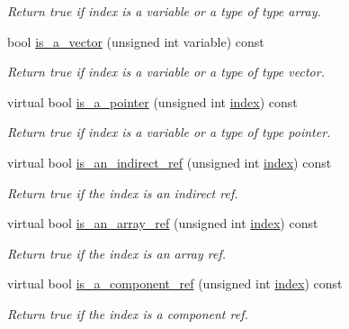 \begin{DoxyCompactItemize}
\begin{DoxyCompactList}\small\item\em Return true if index is a variable or a type of type array. \end{DoxyCompactList}\item 
bool \hyperlink{classBehavioralHelper_a3aaba4321f615da5c2e5d35de11344b6}{is\+\_\+a\+\_\+vector} (unsigned int variable) const
\begin{DoxyCompactList}\small\item\em Return true if index is a variable or a type of type vector. \end{DoxyCompactList}\item 
virtual bool \hyperlink{classBehavioralHelper_a1c00023a8c27e720ca4b125e6980d595}{is\+\_\+a\+\_\+pointer} (unsigned int \hyperlink{tutorial__pact__2019_2Introduction_2third_2include_2Keccak_8h_a028c9bdc8344cca38ab522a337074797}{index}) const
\begin{DoxyCompactList}\small\item\em Return true if index is a variable or a type of type pointer. \end{DoxyCompactList}\item 
virtual bool \hyperlink{classBehavioralHelper_ab8596a332f4b4e31b86c750afec5b47f}{is\+\_\+an\+\_\+indirect\+\_\+ref} (unsigned int \hyperlink{tutorial__pact__2019_2Introduction_2third_2include_2Keccak_8h_a028c9bdc8344cca38ab522a337074797}{index}) const
\begin{DoxyCompactList}\small\item\em Return true if the index is an indirect ref. \end{DoxyCompactList}\item 
virtual bool \hyperlink{classBehavioralHelper_af5d46a8fdf37f33a68436389fafc34b9}{is\+\_\+an\+\_\+array\+\_\+ref} (unsigned int \hyperlink{tutorial__pact__2019_2Introduction_2third_2include_2Keccak_8h_a028c9bdc8344cca38ab522a337074797}{index}) const
\begin{DoxyCompactList}\small\item\em Return true if the index is an array ref. \end{DoxyCompactList}\item 
virtual bool \hyperlink{classBehavioralHelper_a4f81293e41ce4964ead8957f6bc4879e}{is\+\_\+a\+\_\+component\+\_\+ref} (unsigned int \hyperlink{tutorial__pact__2019_2Introduction_2third_2include_2Keccak_8h_a028c9bdc8344cca38ab522a337074797}{index}) const
\begin{DoxyCompactList}\small\item\em Return true if the index is a component ref. \end{DoxyCompactList}\item 

\end{DoxyCompactItemize}
